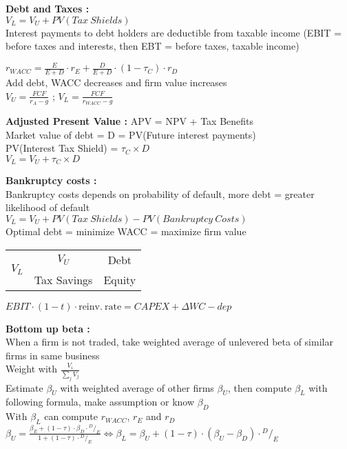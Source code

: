 \documentclass[a4paper,twocolumn]{article}
\begin{document}
\textbf{Debt and Taxes :}\\
$V_L = V_U + PV(Tax\ Shields)$\\
Interest payments to debt holders are deductible from taxable income (EBIT = before taxes and interests, then EBT = before taxes, taxable income)

$r_{WACC} = \frac{E}{E+D}\cdot r_E + \frac{D}{E+D}\cdot(1-\tau_C)\cdot r_D$\\
Add debt, WACC decreases and firm value increases\\
$V_U = \frac{FCF}{r_A-g}$ ; $V_L = \frac{FCF}{r_{WACC}-g}$

\textbf{Adjusted Present Value :} APV = NPV + Tax Benefits\\
Market value of debt = D = PV(Future interest payments)\\
PV(Interest Tax Shield) = $\tau_C \times D$\\
$V_L = V_U + \tau_C \times D$

\textbf{Bankruptcy costs :}\\
Bankruptcy costs depends on probability of default, more debt = greater likelihood of default\\
$V_L = V_U + PV(Tax\ Shields) -PV(Bankruptcy\ Costs)$\\
Optimal debt = minimize WACC = maximize firm value
\vspace{-0.4cm}
\begin{center}
\begin{tabular}{|c|c|c|}
\hline
\multirow{4}{*}{$V_L$} & \multirow{3}{*}{$V_U$} & \multirow{2}{*}{Debt}\\
 & & \\
\cline{3-3}
& & \multirow{2}{*}{Equity}\\
\cline{2-2}
& Tax Savings & \\
\hline
\end{tabular}
\end{center}

$EBIT \cdot (1-t) \cdot \mathrm{reinv.\ rate} = CAPEX + \Delta WC - dep$

\textbf{Bottom up beta :}\\
When a firm is not traded, take weighted average of unlevered beta of similar firms in same business\\
Weight with $\frac{V_i}{\sum_j V_j}$\\
Estimate $\beta_U$ with weighted average of other firms $\beta_U$, then compute $\beta_L$ with following formula, make assumption or know $\beta_D$\\
With $\beta_L$ can compute $r_{WACC}$, $r_E$ and $r_D$\\
$\beta_U = \frac{\beta_E + (1-\tau) \cdot \beta_D \cdot {}^D/_E}{1 + (1-\tau) \cdot {}^D/_E} \Leftrightarrow \beta_L = \beta_U + (1-\tau) \cdot (\beta_U - \beta_D) \cdot {}^D/_E$
\end{document}
